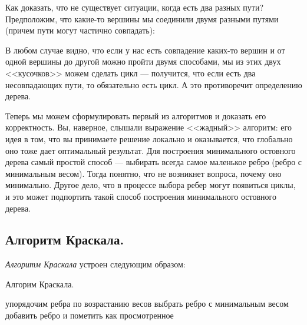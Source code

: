 \documentclass[russian]{lecture-notes}
\begin{document}
\begin{enumerate}
		Как доказать, что не существует ситуации, когда есть два разных пути? Предположим, что какие-то вершины мы соединили двумя разными путями (причем пути могут частично совпадать):
		
		\begin{figure}[h]
			\centering
		\end{figure}
		
		В любом случае видно, что если у нас есть совпадение каких-то вершин и от одной вершины до другой можно пройти двумя способами, мы из этих двух <<кусочков>> можем сделать цикл --- получится, что если есть два несовпадающих пути, то обязательно есть цикл. А это противоречит определению дерева. 
	\end{enumerate}
	
	Теперь мы можем сформулировать первый из алгоритмов и доказать его корректность. Вы, наверное, слышали выражение <<жадный>> алгоритм: его идея в том, что вы принимаете решение локально и оказывается, что глобально оно тоже дает оптимальный результат. Для построения минимального остовного дерева самый простой способ --- выбирать всегда самое маленькое ребро (ребро с минимальным весом). Тогда понятно, что не возникнет вопроса, почему оно минимально. Другое дело, что в процессе выбора ребер могут появиться циклы, и это может подпортить такой способ построения минимального остовного дерева.\\ 
	
	\subsection*{Алгоритм Краскала.}
	{\em Алгоритм Краскала} устроен следующим образом: 
	
	\begin{algorithm}[H]
		\caption{Алгорим Краскала.}
		\label{alg:two}
		\begin{algorithmic}
			\State упорядочим ребра по возрастанию весов
				\State выбрать ребро с минимальным весом
					\State добавить ребро и пометить как просмотренное
				\EndIf
			\EndFor
		\end{algorithmic}
	\end{algorithm}
	
\end{document}
